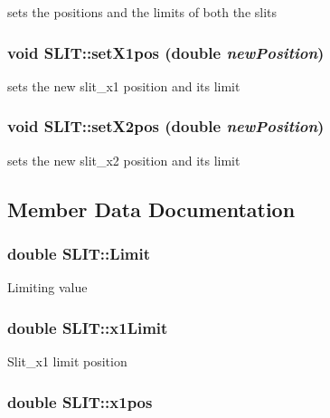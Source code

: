 sets the positions and the limits of both the slits 
\subsubsection{\setlength{\rightskip}{0pt plus 5cm}void SLIT::set\-X1pos (double {\em new\-Position})}\label{classSLIT_0f2d600483fc0711d342324157591689}


sets the new slit\_\-x1 position and its limit 
\subsubsection{\setlength{\rightskip}{0pt plus 5cm}void SLIT::set\-X2pos (double {\em new\-Position})}\label{classSLIT_f87749bc634265a89c282d8c596cae8d}


sets the new slit\_\-x2 position and its limit 

\subsection{Member Data Documentation}
\subsubsection{\setlength{\rightskip}{0pt plus 5cm}double \bf{SLIT::Limit}\hspace{0.3cm}{\tt  [private]}}\label{classSLIT_a19aa07ec71d7247e6eeca8b4eb1b098}


Limiting value 
\subsubsection{\setlength{\rightskip}{0pt plus 5cm}double \bf{SLIT::x1Limit}\hspace{0.3cm}{\tt  [private]}}\label{classSLIT_3bc3810f3692716f10408706d2f35ac4}


Slit\_\-x1 limit position 
\subsubsection{\setlength{\rightskip}{0pt plus 5cm}double \bf{SLIT::x1pos}\hspace{0.3cm}{\tt  [private]}}\label{classSLIT_3f05f690fd412f0a36cbe96310dbcb35}


